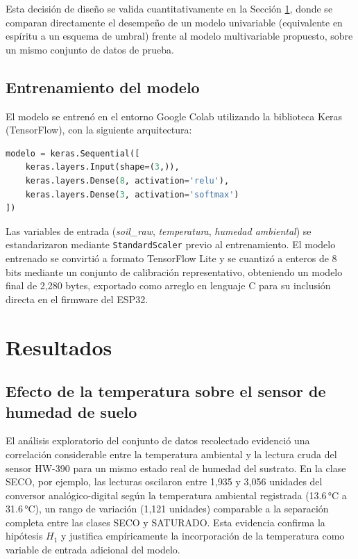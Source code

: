 \documentclass[12pt,a4paper]{article}
\begin{document}
Esta decisión de diseño se valida cuantitativamente en la Sección \ref{sec:resultados}, donde se comparan directamente el desempeño de un modelo univariable (equivalente en espíritu a un esquema de umbral) frente al modelo multivariable propuesto, sobre un mismo conjunto de datos de prueba.

\subsection{Entrenamiento del modelo}
El modelo se entrenó en el entorno Google Colab utilizando la biblioteca Keras (TensorFlow), con la siguiente arquitectura:

\begin{lstlisting}[language=Python, caption={Arquitectura del modelo de clasificación.}]
modelo = keras.Sequential([
    keras.layers.Input(shape=(3,)),
    keras.layers.Dense(8, activation='relu'),
    keras.layers.Dense(3, activation='softmax')
])
\end{lstlisting}

Las variables de entrada (\textit{soil\_raw}, \textit{temperatura}, \textit{humedad ambiental}) se estandarizaron mediante \texttt{StandardScaler} previo al entrenamiento. El modelo entrenado se convirtió a formato TensorFlow Lite y se cuantizó a enteros de 8 bits mediante un conjunto de calibración representativo, obteniendo un modelo final de 2{,}280 bytes, exportado como arreglo en lenguaje C para su inclusión directa en el firmware del ESP32.

\section{Resultados}
\label{sec:resultados}

\subsection{Efecto de la temperatura sobre el sensor de humedad de suelo}
El análisis exploratorio del conjunto de datos recolectado evidenció una correlación considerable entre la temperatura ambiental y la lectura cruda del sensor HW-390 para un mismo estado real de humedad del sustrato. En la clase SECO, por ejemplo, las lecturas oscilaron entre 1{,}935 y 3{,}056 unidades del conversor analógico-digital según la temperatura ambiental registrada (13.6\,°C a 31.6\,°C), un rango de variación (1{,}121 unidades) comparable a la separación completa entre las clases SECO y SATURADO. Esta evidencia confirma la hipótesis $H_1$ y justifica empíricamente la incorporación de la temperatura como variable de entrada adicional del modelo.
\end{document}
